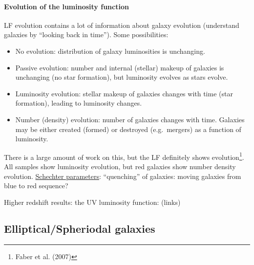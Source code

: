 \documentclass{article}
\newcommand{\mynotes}[1]{\textcolor{cadmiumgreen}{#1}}
\begin{document}
\paragraph{Evolution of the luminosity function}
LF evolution contains a lot of information about galaxy evolution
(understand galaxies by ``looking back in time'').
Some possibilities:
\begin{itemize}
    \item No evolution: distribution of galaxy luminosities is unchanging.
    \item Passive evolution: number and internal (stellar) makeup of
        galaxies is unchanging \mynotes{(no star formation)},
        but luminosity evolves as stars evolve.
    \item Luminosity evolution: stellar makeup of galaxies changes with
        time (star formation), leading to luminosity changes.
    \item Number (density) evolution: number of galaxies changes with time.
        Galaxies may be either created (formed) or destroyed (e.g.\
        mergers) as a function of luminosity.
\end{itemize}
There is a large amount of work on this, but the LF definitely shows
evolution\footnote{Faber et al. (2007)}. All samples show luminosity
evolution, but red galaxies show number density evolution. \href{http://astronomy.nmsu.edu/holtz/a555/images/faberdeepf7.htm}
{Schechter parameters}: ``quenching'' of galaxies: moving galaxies from blue
to red sequence?

Higher redshift results: the UV luminosity function: (links)

\newpage
\subsection{Elliptical/Spheriodal galaxies}
\end{document}
